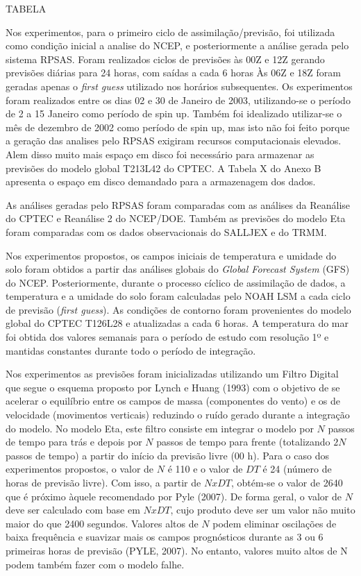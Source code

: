 TABELA

Nos experimentos, para o primeiro ciclo de assimilação/previsão, foi utilizada como condição inicial a analise do NCEP, e posteriormente a análise gerada pelo sistema RPSAS. Foram realizados ciclos de previsões às 00Z e 12Z gerando previsões diárias para 24 horas, com saídas a cada 6 horas Às 06Z e 18Z foram geradas apenas o \textit{first guess} utilizado nos horários subsequentes. Os experimentos foram realizados entre os dias 02 e 30 de Janeiro de 2003, utilizando-se o período de 2 a 15 Janeiro como período de spin up.  Também foi idealizado utilizar-se o mês de dezembro de 2002 como período de spin up, mas isto não foi feito porque a geração das analises pelo RPSAS exigiram recursos computacionais elevados.  Alem disso muito mais espaço em disco foi necessário para armazenar as previsões do modelo global T213L42 do CPTEC. A Tabela X do Anexo B apresenta o espaço em disco demandado para a armazenagem dos dados.

As análises geradas pelo RPSAS foram comparadas com as análises da Reanálise do CPTEC e Reanálise 2 do NCEP/DOE. Também as previsões do modelo Eta foram comparadas com os dados observacionais do SALLJEX e do TRMM.

Nos experimentos propostos, os campos iniciais de temperatura e umidade do solo foram obtidos a partir das análises globais do \textit{Global Forecast System} (GFS) do NCEP. Posteriormente, durante o processo cíclico de assimilação de dados, a temperatura e a umidade do solo foram calculadas pelo NOAH LSM a cada ciclo de previsão (\textit{first guess}). As condições de contorno foram provenientes do modelo global do CPTEC T126L28 e atualizadas a cada 6 horas. A temperatura do mar foi obtida dos valores semanais para o período de estudo com resolução 1º e mantidas constantes durante todo o período de integração.

Nos experimentos as previsões foram inicializadas utilizando um Filtro Digital que segue o esquema proposto por Lynch e Huang (1993) com o objetivo de se acelerar o equilíbrio entre os campos de massa (componentes do vento) e os de velocidade (movimentos verticais) reduzindo o ruído gerado durante a integração do modelo. No modelo Eta, este filtro consiste em integrar o modelo por $N$ passos de tempo para trás e depois por $N$ passos de tempo para frente (totalizando $2N$ passos de tempo) a partir do início da previsão livre (00 h). Para o caso dos experimentos propostos, o valor de $N$ é 110 e o valor de $DT$ é 24 (número de horas de previsão livre). Com isso, a partir de $N x DT$, obtém-se o valor de 2640 que é próximo àquele recomendado por Pyle (2007). De forma geral, o valor de $N$ deve ser calculado com base em $N x DT$, cujo produto deve ser um valor não muito maior do que 2400 segundos. Valores altos de $N$ podem eliminar oscilações de baixa frequência e suavizar mais os campos prognósticos durante as 3 ou 6 primeiras horas de previsão (PYLE, 2007). No entanto, valores muito altos de N podem também fazer com o modelo falhe.

